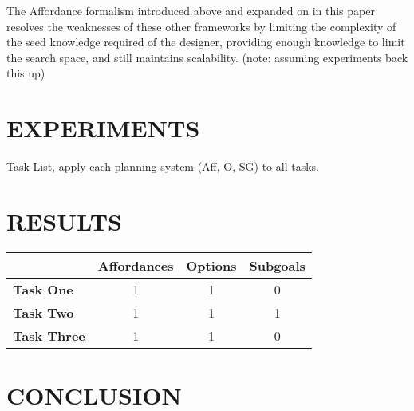 \documentclass[]{article}
\begin{document}
The Affordance formalism introduced above and expanded on in this paper resolves the weaknesses of these other frameworks by limiting the complexity of the seed knowledge required of the designer, providing enough knowledge to limit the search space, and still maintains scalability. (note: assuming experiments back this up)


\section{EXPERIMENTS}

Task List, apply each planning system (Aff, O, SG) to all tasks.

\section{RESULTS}

\begin{tabular}{ l || c | c | c }
  & Affordances & Options & Subgoals \\
  \hline
  {\bf Task One} & 1 & 1 & 0 \\
  {\bf Task Two} & 1 & 1 & 1 \\
  {\bf Task Three} & 1 & 1 & 0 \\
\end{tabular}



\section{CONCLUSION}


  
\end{document}
